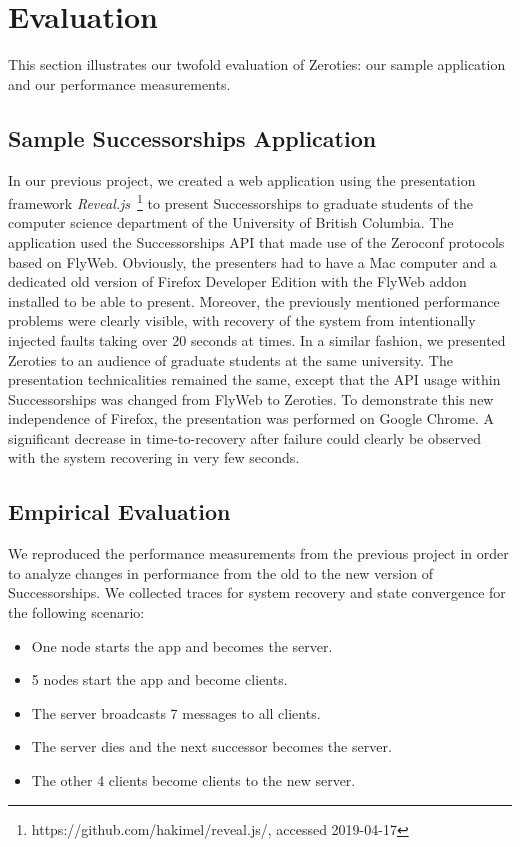 \section{Evaluation}
\label{sec:evaluation}

This section illustrates our twofold evaluation of Zeroties: our sample application and our performance measurements.

\subsection{Sample Successorships Application}

In our previous project, we created a web application using the presentation framework \textit{Reveal.js}~\footnote{https://github.com/hakimel/reveal.js/, accessed 2019-04-17} to present Successorships to graduate students of the computer science department of the University of British Columbia.
The application used the Successorships API that made use of the Zeroconf protocols based on FlyWeb.
Obviously, the presenters had to have a Mac computer and a dedicated old version of Firefox Developer Edition with the FlyWeb addon installed to be able to present.
Moreover, the previously mentioned performance problems were clearly visible, with recovery of the system from intentionally injected faults taking over 20 seconds at times.
In a similar fashion, we presented Zeroties to an audience of graduate students at the same university.
The presentation technicalities remained the same, except that the API usage within Successorships was changed from FlyWeb to Zeroties.
To demonstrate this new independence of Firefox, the presentation was performed on Google Chrome.
A significant decrease in time-to-recovery after failure could clearly be observed with the system recovering in very few seconds.

\subsection{Empirical Evaluation}

We reproduced the performance measurements from the previous project in order to analyze changes in performance from the old to the new version of Successorships.
We collected traces for system recovery and state convergence for the following scenario:
\begin{itemize}
\item One node starts the app and becomes the server.
\item 5 nodes start the app and become clients.
\item The server broadcasts 7 messages to all clients.
\item The server dies and the next successor becomes the server.
\item The other 4 clients become clients to the new server.
\end{itemize}

